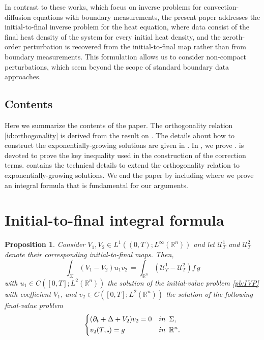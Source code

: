 \documentclass[10pt,a4paper]{amsart}
\newtheorem{proposition}{Proposition}[section]
\newcommand{\R}{\mathbb{R}}
\newcommand{\tm}{\mathrm{t}}
\begin{document}
In contrast to these works, which focus on inverse problems for convection-diffusion equations with boundary measurements, the present paper addresses the initial-to-final inverse problem for the heat equation, where data consist of the final heat density of the system for every initial heat density, and the zeroth-order perturbation is recovered from the initial-to-final map rather than from boundary measurements. This formulation allows us to consider non-compact perturbations, which seem beyond the scope of standard boundary data approaches.


\subsection*{Contents} Here we summarize the contents of the paper. The orthogonality relation
\eqref{id:orthogonality} is derived from the result on . The details 
about how to construct the exponentially-growing solutions are given in .
In , we prove .  is
devoted to prove the key inequality used in the construction of the correction terms.
 contains the technical details to extend the orthogonality relation
to exponentially-growing solutions. We end the paper by including 
where we prove an integral formula that is fundamental for our arguments.


\section{Initial-to-final integral formula}\label{sec:int_formula}
\begin{proposition}\label{prop:integral_formula}\sl Consider 
$V_1, V_2 \in L^1((0,T); L^\infty(\R^n)) $ and let $ \mathcal{U}_T^1$ and 
$ \mathcal{U}_T^2$ denote their corresponding initial-to-final maps.
Then,
\[\int_\Sigma (V_1 - V_2) u_1 v_2 \, = \int_{\R^n} (\mathcal{U}_T^1 - \mathcal{U}_T^2)f \, g\]
with $u_1 \in C([0,T]; L^2(\R^n))$ the solution of the initial-value problem \eqref{pb:IVP}
with coefficient $V_1$, and $v_2 \in C([0,T]; L^2(\R^n))$ the solution of the following 
final-value problem
\begin{equation}
	\left\{
		\begin{aligned}
		& (\partial_\tm + \Delta + V_2) v_2 = 0 & & \textnormal{in} \enspace \Sigma, \\
		& v_2(T, \centerdot) = g &  & \textnormal{in} \enspace \R^n.
		\end{aligned}
	\right.
	\label{pb:FVP}
\end{equation}
\end{proposition}
\end{document}

